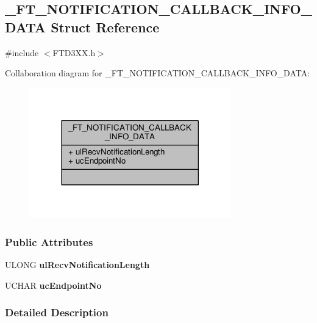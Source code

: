 \subsection{\+\_\+\+F\+T\+\_\+\+N\+O\+T\+I\+F\+I\+C\+A\+T\+I\+O\+N\+\_\+\+C\+A\+L\+L\+B\+A\+C\+K\+\_\+\+I\+N\+F\+O\+\_\+\+D\+A\+TA Struct Reference}
\label{struct__FT__NOTIFICATION__CALLBACK__INFO__DATA}


{\ttfamily \#include $<$F\+T\+D3\+X\+X.\+h$>$}



Collaboration diagram for \+\_\+\+F\+T\+\_\+\+N\+O\+T\+I\+F\+I\+C\+A\+T\+I\+O\+N\+\_\+\+C\+A\+L\+L\+B\+A\+C\+K\+\_\+\+I\+N\+F\+O\+\_\+\+D\+A\+TA\+:
\nopagebreak
\begin{figure}[H]
\begin{center}
\leavevmode
\includegraphics[width=248pt]{d0/dfa/struct__FT__NOTIFICATION__CALLBACK__INFO__DATA__coll__graph}
\end{center}
\end{figure}
\subsubsection*{Public Attributes}
\begin{DoxyCompactItemize}
\item 
U\+L\+O\+NG {\bf ul\+Recv\+Notification\+Length}
\item 
U\+C\+H\+AR {\bf uc\+Endpoint\+No}
\end{DoxyCompactItemize}


\subsubsection{Detailed Description}


